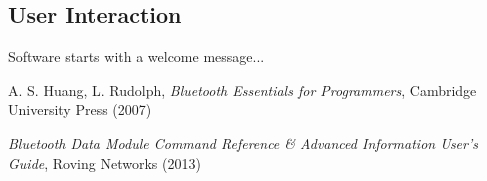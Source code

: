 \documentclass[twoside]{article}
\begin{document}
\begin{multicols}{2}
\subsection{User Interaction}

Software starts with a welcome message...



\begin{thebibliography}{99} %

\bibitem{} A. S. Huang, L. Rudolph,
  \emph{Bluetooth Essentials for Programmers},
  Cambridge University Press (2007)

\bibitem{}
  \emph{Bluetooth Data Module Command Reference \& Advanced Information User's Guide},
  Roving Networks (2013)

 
\end{thebibliography}


\end{multicols}
\end{document}
